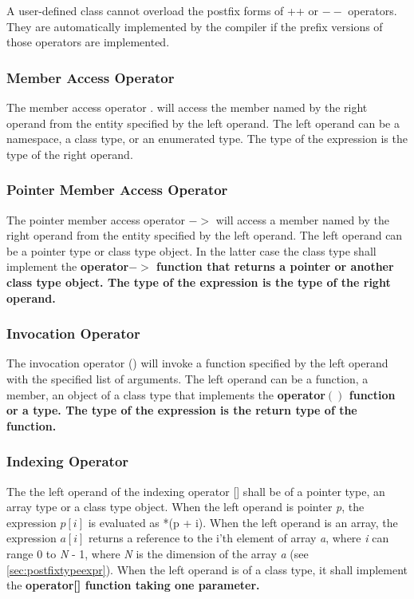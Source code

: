 \documentclass[a4paper,oneside,11pt]{article}
\begin{document}
A user-defined class cannot overload the postfix forms of ++ or $--$ operators.
They are automatically implemented by the compiler if the prefix versions of those operators are implemented.

\subsubsection{Member Access Operator}\label{member-access}

The member access operator . will access the member named by the right operand from the entity specified by the left operand.
The left operand can be a namespace, a class type, or an enumerated type.
The type of the expression is the type of the right operand.

\subsubsection{Pointer Member Access Operator}\label{ptr-member-access}

The pointer member access operator $->$ will access a member named by the right operand from the entity specified by the left operand.
The left operand can be a pointer type or class type object. In the latter case the class type shall implement the \bf{operator$->$}
function that returns a pointer or another class type object. The type of the expression is the type of the right operand.

\subsubsection{Invocation Operator}\label{invocation}

The invocation operator () will invoke a function specified by the left operand with the specified list of arguments.
The left operand can be a function, a member, an object of a class type that implements the \bf{operator$()$} function or a type.
The type of the expression is the return type of the function.

\subsubsection{Indexing Operator}\label{indexing}

The the left operand of the indexing operator [] shall be of a pointer type, an array type or a class type object.
When the left operand is pointer \emph{p}, the expression $p[i]$ is evaluated as *(p + i).
When the left operand is an array, the expression $a[i]$ returns a reference to the i'th element of array \emph{a},
where \emph{i} can range 0 to \emph{N} - 1, where \emph{N} is the dimension of the array \emph{a} (see \ref{sec:postfixtypeexpr}).
When the left operand is of a class type, it shall implement the \bf{operator[]} function taking one parameter.
\end{document}
